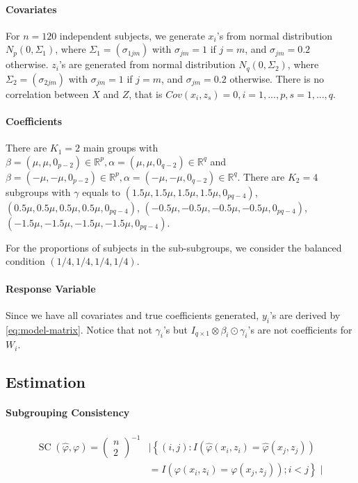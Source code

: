 \documentclass[12pt, a4paper, oneside]{article}
\numberwithin{equation}{section}
\begin{document}
\paragraph{Covariates}
For $n=120$ independent subjects, we generate $x_i$'s from normal distribution $N_p(0, \Sigma_1)$, where $\Sigma_1 = (\sigma_{1jm})$ with $\sigma_{jm}=1$ if $j=m$, and $\sigma_{jm}=0.2$ otherwise. $z_i$'s are generated from normal distribution $N_q(0, \Sigma_2)$, where $\Sigma_2 = (\sigma_{2jm})$ with $\sigma_{jm}=1$ if $j=m$, and $\sigma_{jm}=0.2$ otherwise. There is no correlation between $X$ and $Z$, that is $Cov(x_i, z_s) = 0, i=1,...,p, s=1,...,q$.

\paragraph{Coefficients}
There are $K_1 = 2$ main groups with $\beta = (\mu, \mu, 0_{p-2}) \in \mathbb{R}^{p}, \alpha =  (\mu, \mu, 0_{q-2}) \in \mathbb{R}^{q}$ and $\beta =(-\mu, -\mu, 0_{p-2}) \in \mathbb{R}^{p}, \alpha = (-\mu, -\mu, 0_{q-2}) \in \mathbb{R}^{q}$. There are $K_2 = 4$ subgroups with $\gamma$ equals to $(1.5\mu,1.5\mu,1.5\mu,1.5\mu,0_{pq-4})$, $(0.5\mu,0.5\mu,0.5\mu,0.5\mu,0_{pq-4})$, $(-0.5\mu,-0.5\mu,-0.5\mu,-0.5\mu,0_{pq-4})$,  \\$(-1.5\mu,-1.5\mu,-1.5\mu,-1.5\mu,0_{pq-4})$.

For the proportions of subjects in the sub-subgroups, we consider the balanced condition $(1/4,1/4,1/4,1/4)$.

\paragraph{Response Variable}

Since we have all covariates and true coefficients generated, $y_i$'s are derived by \ref{eq:model-matrix}. Notice that not $\gamma_i$'s but $I_{q\times 1}\otimes \beta_i\odot \gamma_i$'s are not coefficients for $W_i$.

\subsection{Estimation}
\label{subsec:estimation}
\paragraph{Subgrouping Consistency}

\begin{equation}
	\label{eq:sc}
	\begin{aligned}
		\operatorname{SC}(\widehat{\varphi}, \varphi) =\left(\begin{array}{l}
			n \\
			2
		\end{array}\right)^{-1} & \mid\left\{(i, j):  I\left(\widehat{\varphi}\left(x_{i}, z_{i}\right)=\widehat{\varphi}\left(x_{j}, z_{j}\right)\right)\right.\\
		&\left.=I\left(\varphi\left(x_{i}, z_{i}\right)=\varphi\left(x_{j}, z_{j}\right)\right) ; i<j\right\} \mid
	\end{aligned}
\end{equation}
\end{document}
